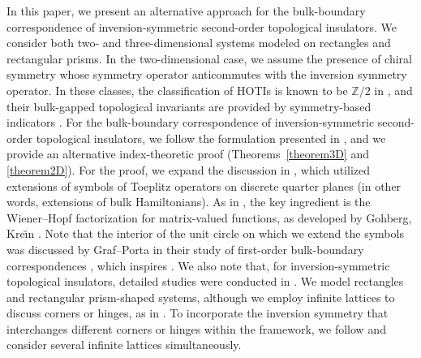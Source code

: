 \documentclass{amsart}
\theoremstyle{plain}
\theoremstyle{definition}
\theoremstyle{remark}
\newcommand{\Z}{\mathbb{Z}}
\begin{document}
In this paper, we present an alternative approach for the bulk-boundary correspondence of inversion-symmetric second-order topological insulators.
We consider both two- and three-dimensional systems modeled on rectangles and rectangular prisms.
In the two-dimensional case, we assume the presence of chiral symmetry whose symmetry operator anticommutes with the inversion symmetry operator.
In these classes, the classification of HOTIs is known to be $\Z/2$ in \cite{Geier18,Khalaf18b},
and their bulk-gapped topological invariants are provided by symmetry-based indicators \cite{Po17,Khalaf18a,MW18,OW18,OTY21,SO21}.
For the bulk-boundary correspondence of inversion-symmetric second-order topological insulators, we follow the formulation presented in \cite{TTM20a,TTM20b}, and we provide an alternative index-theoretic proof (Theorems~\ref{theorem3D} and \ref{theorem2D}).
For the proof, we expand the discussion in \cite{Hayashi5}, which utilized extensions of symbols of Toeplitz operators on discrete quarter planes (in other words, extensions of bulk Hamiltonians).
As in \cite{Hayashi5}, the key ingredient is the Wiener--Hopf factorization for matrix-valued functions, as developed by Gohberg, Kre{\u \i}n \cite{GK58r,CG81,GKS03}.
Note that the interior of the unit circle on which we extend the symbols was discussed by Graf--Porta in their study of first-order bulk-boundary correspondences \cite{GP13}, which inspires \cite{Hayashi5}.
We also note that, for inversion-symmetric topological insulators, detailed studies were conducted in \cite{HPB11}.
We model rectangles and rectangular prism-shaped systems, although we employ infinite lattices to discuss corners or hinges, as in \cite{Hayashi2}.
To incorporate the inversion symmetry that interchanges different corners or hinges within the framework, we follow \cite{OPS24a} and consider several infinite lattices simultaneously.
\end{document}
